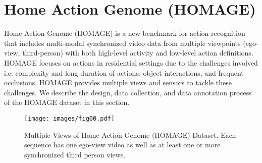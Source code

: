 \documentclass[final]{cvpr}
\begin{document}
\section{Home Action Genome (HOMAGE)}
Home Action Genome (HOMAGE) is a new benchmark for action recognition that includes multi-modal synchronized video data from multiple viewpoints (ego-view,  third-person) with both high-level activity and low-level action definitions. HOMAGE focuses on actions in residential settings due to the challenges involved i.e. complexity and long duration of actions, object interactions, and frequent occlusions. HOMAGE provides multiple views and sensors to tackle these challenges. We describe the design, data collection, and data annotation process of the HOMAGE dataset in this section.

\begin{figure}[t]
    \begin{center}
    \texttt{[image: images/fig00.pdf]}
    \vspace{-20pt}
    \caption{\small Multiple Views of Home Action Genome (HOMAGE) Dataset. Each sequence has one ego-view video as well as at least one or more synchronized third person views. \label{fig:home_action_genome}}
    \vspace{-20pt}
    \end{center}
\end{figure}
\end{document}
